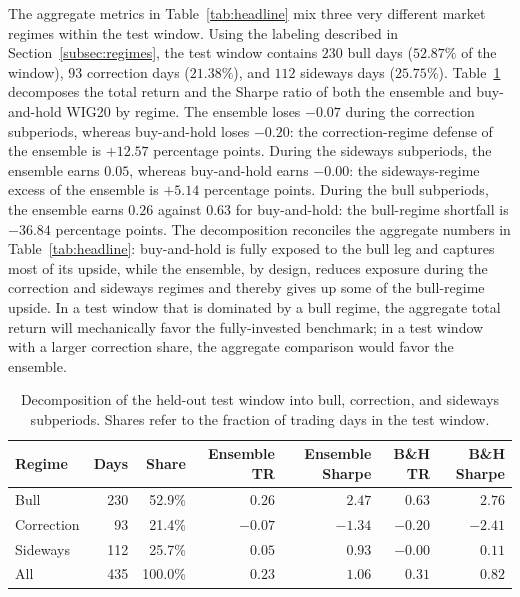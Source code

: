 \documentclass{ieeeaccess}
\newcommand{\RegBullDays}{\ensuremath{230}}
\newcommand{\RegCorrectionDays}{\ensuremath{93}}
\newcommand{\RegSidewaysDays}{\ensuremath{112}}
\newcommand{\RegBullShare}{52.87\%}
\newcommand{\RegCorrectionShare}{21.38\%}
\newcommand{\RegSidewaysShare}{25.75\%}
\newcommand{\EnsBullTR}{\ensuremath{0.26}}
\newcommand{\EnsCorrectionTR}{\ensuremath{-0.07}}
\newcommand{\EnsSidewaysTR}{\ensuremath{0.05}}
\newcommand{\BHBullTR}{\ensuremath{0.63}}
\newcommand{\BHCorrectionTR}{\ensuremath{-0.20}}
\newcommand{\BHSidewaysTR}{\ensuremath{-0.00}}
\newcommand{\CorrectionDefencePP}{\ensuremath{+12.57}}
\newcommand{\SidewaysExcessPP}{\ensuremath{+5.14}}
\newcommand{\BullShortfallPP}{\ensuremath{-36.84}}
\begin{document}
The aggregate metrics in Table~\ref{tab:headline} mix three very different market regimes within the test window. Using the labeling described in Section~\ref{subsec:regimes}, the test window contains \RegBullDays{} bull days ($\RegBullShare{}$ of the window), \RegCorrectionDays{} correction days ($\RegCorrectionShare{}$), and \RegSidewaysDays{} sideways days ($\RegSidewaysShare{}$). Table~\ref{tab:regime} decomposes the total return and the Sharpe ratio of both the ensemble and buy-and-hold WIG20 by regime. The ensemble loses $\EnsCorrectionTR{}$ during the correction subperiods, whereas buy-and-hold loses $\BHCorrectionTR{}$: the correction-regime defense of the ensemble is \CorrectionDefencePP{} percentage points. During the sideways subperiods, the ensemble earns $\EnsSidewaysTR{}$, whereas buy-and-hold earns $\BHSidewaysTR{}$: the sideways-regime excess of the ensemble is \SidewaysExcessPP{} percentage points. During the bull subperiods, the ensemble earns $\EnsBullTR{}$ against $\BHBullTR{}$ for buy-and-hold: the bull-regime shortfall is \BullShortfallPP{} percentage points. The decomposition reconciles the aggregate numbers in Table~\ref{tab:headline}: buy-and-hold is fully exposed to the bull leg and captures most of its upside, while the ensemble, by design, reduces exposure during the correction and sideways regimes and thereby gives up some of the bull-regime upside. In a test window that is dominated by a bull regime, the aggregate total return will mechanically favor the fully-invested benchmark; in a test window with a larger correction share, the aggregate comparison would favor the ensemble.

\begin{table}[t]
\centering
\caption{Decomposition of the held-out test window into bull, correction, and sideways subperiods. Shares refer to the fraction of trading days in the test window.}
\label{tab:regime}
\begin{tabular}{lrrrrrr}
\toprule
Regime & Days & Share & Ensemble TR & Ensemble Sharpe & B\&H TR & B\&H Sharpe \\
\midrule
Bull & 230 & 52.9\% & $0.26$ & $2.47$ & $0.63$ & $2.76$ \\
Correction & 93 & 21.4\% & $-0.07$ & $-1.34$ & $-0.20$ & $-2.41$ \\
Sideways & 112 & 25.7\% & $0.05$ & $0.93$ & $-0.00$ & $0.11$ \\
All & 435 & 100.0\% & $0.23$ & $1.06$ & $0.31$ & $0.82$ \\
\bottomrule
\end{tabular}
\end{table}
\end{document}
